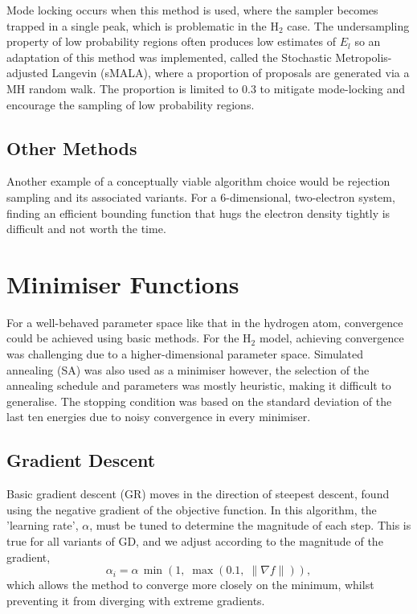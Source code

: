 \documentclass[journal,12pt]{Imperial_lab_report}
\begin{document}
        Mode locking occurs when this method is used, where the sampler becomes trapped in a single peak, which is problematic in the H$_2$ case. The undersampling property of low probability regions often produces low estimates of $E_l$ so an adaptation of this method was implemented, called the Stochastic Metropolis-adjusted Langevin (sMALA), where a proportion of proposals are generated via a MH random walk. The proportion is limited to 0.3 to mitigate mode-locking and encourage the sampling of low probability regions.
        
    \subsection{Other Methods}   
        Another example of a conceptually viable algorithm choice would be rejection sampling and its associated variants. For a 6-dimensional, two-electron system, finding an efficient bounding function that hugs the electron density tightly is difficult and not worth the time.
        
\section{Minimiser Functions} \label{minimisers}
    For a well-behaved parameter space like that in the hydrogen atom, convergence could be achieved using basic methods. For the H$_2$ model, achieving convergence was challenging due to a higher-dimensional parameter space. Simulated annealing (SA) was also used as a minimiser however, the selection of the annealing schedule and parameters was mostly heuristic, making it difficult to generalise. The stopping condition was based on the standard deviation of the last ten energies due to noisy convergence in every minimiser. 

    \subsection{Gradient Descent} \label{gradient descent}
        Basic gradient descent (GR) moves in the direction of steepest descent, found using the negative gradient of the objective function. In this algorithm, the 'learning rate', $\alpha$, must be tuned to determine the magnitude of each step. This is true for all variants of GD, and we adjust according to the magnitude of the gradient,
        \begin{equation} \label{learning_rate}
            \alpha_i = \alpha \, \min\!\left( 1,\; \max\!\left( 0.1,\; \lVert \nabla f \rVert \right) \right),
        \end{equation}
        which allows the method to converge more closely on the minimum, whilst preventing it from diverging with extreme gradients.
\end{document}
